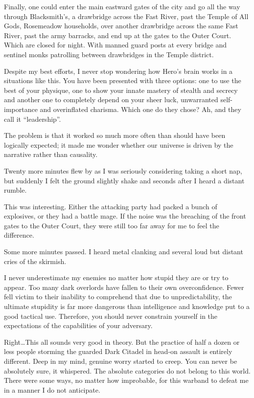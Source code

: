 Finally, one could enter the main eastward gates of the city and go all the way through Blacksmith’s, a drawbridge across the Fast River, past the Temple of All Gods, Rosemeadow households, over another drawbridge across the same Fast River, past the army barracks, and end up at the gates to the Outer Court. Which are closed for night. With manned guard posts at every bridge and sentinel monks patrolling between drawbridges in the Temple district.

Despite my best efforts, I never stop wondering how Hero’s brain works in a situations like this. You have been presented with three options: one to use the best of your physique, one to show your innate mastery of stealth and secrecy and another one to completely depend on your sheer luck, unwarranted self-importance and overinflated charisma. Which one do they chose? Ah, and they call it “leadership”.

The problem is that it worked so much more often than should have been logically expected; it made me wonder whether our universe is driven by the narrative rather than causality.

Twenty more minutes flew by as I was seriously considering taking a short nap, but suddenly I felt the ground slightly shake and seconds after I heard a distant rumble.

This was interesting. Either the attacking party had packed a bunch of explosives, or they had a battle mage. If the noise was the breaching of the front gates to the Outer Court, they were still too far away for me to feel the difference.

Some more minutes passed. I heard metal clanking and several loud but distant cries of the skirmish.

I never underestimate my enemies no matter how stupid they are or try to appear. Too many dark overlords have fallen to their own overconfidence. Fewer fell victim to their inability to comprehend that due to unpredictability, the ultimate stupidity is far more dangerous than intelligence and knowledge put to a good tactical use. Therefore, you should never constrain yourself in the expectations of the capabilities of your adversary.

Right\dots This all sounds very good in theory. But the practice of half a dozen or less people storming the guarded Dark Citadel in head-on assault is entirely different. Deep in my mind, genuine worry started to creep. You can never be absolutely sure, it whispered. The absolute categories do not belong to this world. There were some ways, no matter how improbable, for this warband to defeat me in a manner I do not anticipate.

